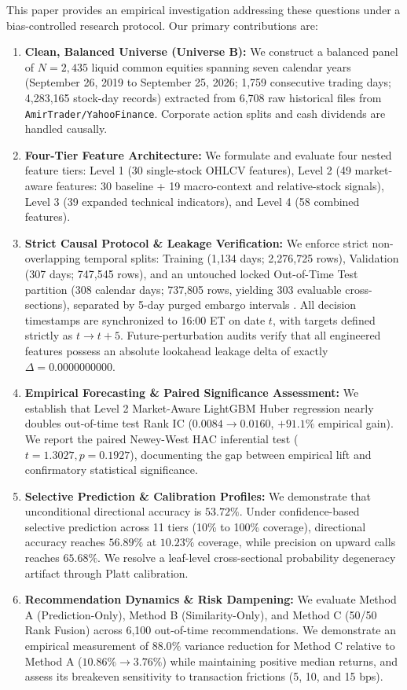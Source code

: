 \documentclass[11pt,a4paper]{article}
\begin{document}
This paper provides an empirical investigation addressing these questions under a bias-controlled research protocol. Our primary contributions are:
\begin{enumerate}
    \item \textbf{Clean, Balanced Universe (Universe B):} We construct a balanced panel of $N = 2,435$ liquid common equities spanning seven calendar years (September 26, 2019 to September 25, 2026; 1,759 consecutive trading days; 4,283,165 stock-day records) extracted from 6,708 raw historical files from \texttt{AmirTrader/YahooFinance}. Corporate action splits and cash dividends are handled causally.
    \item \textbf{Four-Tier Feature Architecture:} We formulate and evaluate four nested feature tiers: Level 1 (30 single-stock OHLCV features), Level 2 (49 market-aware features: 30 baseline + 19 macro-context and relative-stock signals), Level 3 (39 expanded technical indicators), and Level 4 (58 combined features).
    \item \textbf{Strict Causal Protocol \& Leakage Verification:} We enforce strict non-overlapping temporal splits: Training (1,134 days; 2,276,725 rows), Validation (307 days; 747,545 rows), and an untouched locked Out-of-Time Test partition (308 calendar days; 737,805 rows, yielding 303 evaluable cross-sections), separated by 5-day purged embargo intervals \cite{lopez2018advances}. All decision timestamps are synchronized to 16:00 ET on date $t$, with targets defined strictly as $t \to t+5$. Future-perturbation audits verify that all engineered features possess an absolute lookahead leakage delta of exactly $\Delta = 0.0000000000$.
    \item \textbf{Empirical Forecasting \& Paired Significance Assessment:} We establish that Level 2 Market-Aware LightGBM Huber regression nearly doubles out-of-time test Rank IC ($0.0084 \to 0.0160$, $+91.1\%$ empirical gain). We report the paired Newey-West HAC inferential test ($t = 1.3027, p = 0.1927$), documenting the gap between empirical lift and confirmatory statistical significance.
    \item \textbf{Selective Prediction \& Calibration Profiles:} We demonstrate that unconditional directional accuracy is $53.72\%$. Under confidence-based selective prediction across 11 tiers (10\% to 100\% coverage), directional accuracy reaches $56.89\%$ at $10.23\%$ coverage, while precision on upward calls reaches $65.68\%$. We resolve a leaf-level cross-sectional probability degeneracy artifact through Platt calibration.
    \item \textbf{Recommendation Dynamics \& Risk Dampening:} We evaluate Method A (Prediction-Only), Method B (Similarity-Only), and Method C (50/50 Rank Fusion) across 6,100 out-of-time recommendations. We demonstrate an empirical measurement of $88.0\%$ variance reduction for Method C relative to Method A ($10.86\% \to 3.76\%$) while maintaining positive median returns, and assess its breakeven sensitivity to transaction frictions (5, 10, and 15 bps).
\end{enumerate}
\end{document}
